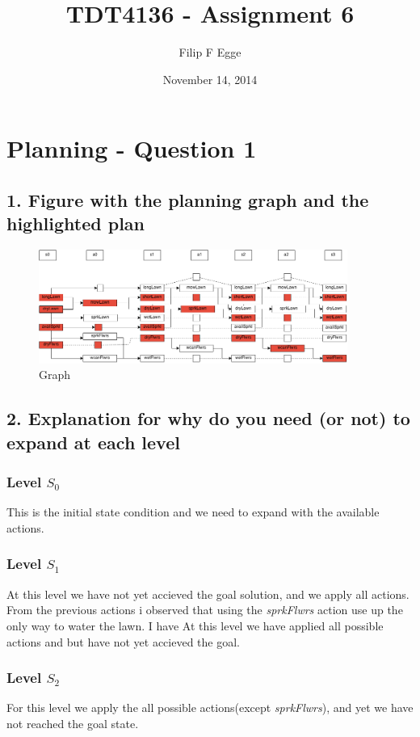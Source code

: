 \documentclass{article}
\begin{document}
\title{TDT4136 - Assignment 6}
\author{Filip F Egge}
\date{November 14, 2014}
\maketitle

\newpage
\section*{Planning - Question 1}
\subsection*{1. Figure with the planning graph and the highlighted plan}
	\FloatBarrier
	\begin{figure}[!htb]
		\caption{Graph}
		\centering
		\includegraphics[width=0.9\textwidth]{graph.png}
	\end{figure}
\FloatBarrier
\subsection*{2. Explanation for why do you need (or not) to expand at each level}
	\subsubsection*{Level $S_0$}
		This is the initial state condition and we need to expand with the available actions.
	\subsubsection*{Level $S_1$}
		At this level we have not yet accieved the goal solution, and we apply all actions. From the previous actions i observed that using the \textit{sprkFlwrs} action use up the only way to water the lawn. I have
		At this level we have applied all possible actions and but have not yet accieved the goal.
	\subsubsection*{Level $S_2$}
		For this level we apply the all possible actions(except \textit{sprkFlwrs}), and yet we have not reached the goal state.
\end{document}
